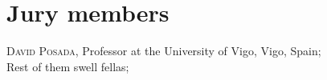 
\chapter*{Jury members}


\noindent \textsc{David Posada}, Professor at the University of Vigo, Vigo, Spain; \\

\noindent Rest of them swell fellas; \\
